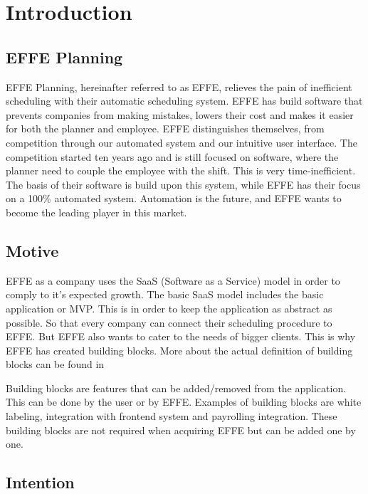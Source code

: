 \chapter{Introduction}

\section{EFFE Planning}
EFFE Planning, hereinafter referred to as EFFE, relieves the pain of inefficient scheduling with their automatic scheduling system. EFFE has build software that prevents companies from making mistakes, lowers their cost and makes it easier for both the planner and employee. EFFE distinguishes themselves, from competition through our automated system and our intuitive user interface. The competition started ten years ago and is still focused on software, where the planner need to couple the employee with the shift. This is very time-inefficient. The basis of their software is build upon this system, while EFFE has their focus on a 100\% automated system. Automation is the future, and EFFE wants to become the leading player in this market.

\section{Motive}
EFFE as a company uses the SaaS (Software as a Service) model in order to comply to it’s expected growth. The basic SaaS model includes the basic application or MVP. This is in order to keep the application as abstract as possible. So that every company can connect their scheduling procedure to EFFE. But EFFE also wants to cater to the needs of bigger clients. This is why EFFE has created building blocks. More about the actual definition of building blocks can be found in 

Building blocks are features that can be added/removed from the application. This can be done by the user or by EFFE. Examples of building blocks are white labeling, integration with frontend system and payrolling integration. These building blocks are not required when acquiring EFFE but can be added one by one.

\section{Intention}
\label{sec:Intention}

